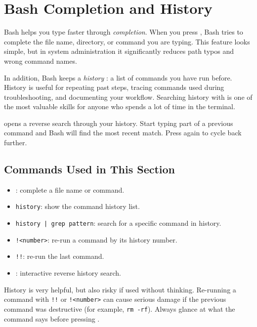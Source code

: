 \section{Bash Completion and History}
\label{sec:completion-history}

Bash helps you type faster through \textit{completion}. When you press
, Bash tries to complete the file name, directory, or command
you are typing. This feature looks simple, but in system administration it
significantly reduces path typos and wrong command names.

In addition, Bash keeps a \textit{history} : a list of commands you have run
before. History is useful for repeating past steps, tracing commands used
during troubleshooting, and documenting your workflow. Searching history with
 is one of the most valuable skills for anyone who spends
a lot of time in the terminal.

\begin{tipbox}
 opens a reverse search through your history. Start typing
part of a previous command and Bash will find the most recent match. Press
 again to cycle back further.
\end{tipbox}

\subsection*{Commands Used in This Section}

\begin{itemize}
  \item {}: complete a file name or command.
  \item \texttt{history}: show the command history list.
  \item \texttt{history | grep pattern}: search for a specific command in history.
  \item \texttt{!<number>}: re-run a command by its history number.
  \item \texttt{!!}: re-run the last command.
  \item {}: interactive reverse history search.
\end{itemize}

\begin{warningbox}
History is very helpful, but also risky if used without thinking. Re-running
a command with \texttt{!!} or \texttt{!<number>} can cause serious damage if
the previous command was destructive (for example, \texttt{rm -rf}).
Always glance at what the command says before pressing .
\end{warningbox}

